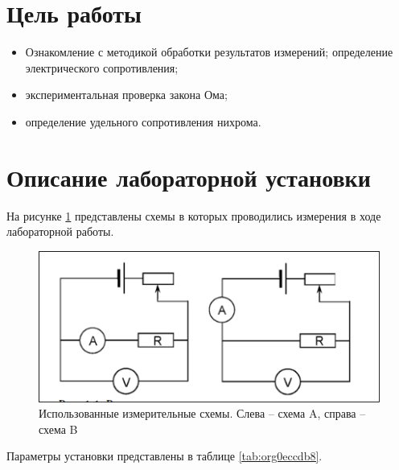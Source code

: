 \documentclass[14pt]{extarticle}
\begin{document}
\tableofcontents \clearpage


\section{Цель работы}
\label{sec:org79ca03a}

\begin{itemize}
\item Ознакомление с методикой обработки результатов измерений;
определение электрического сопротивления;
\item экспериментальная проверка закона Ома;
\item определение удельного сопротивления нихрома.
\end{itemize}

\section{Описание лабораторной установки}
\label{sec:org2fb4a39}

На рисунке \ref{fig:org949745b} представлены схемы в которых проводились измерения в ходе
лабораторной работы.

\begin{figure}[H]
\centering
\includegraphics[width=.9\linewidth]{./images/twoSchemes.png}
\caption{\label{fig:org949745b}Использованные измерительные схемы. Слева – схема A, справа – схема B}
\end{figure}

Параметры установки представлены в таблице \ref{tab:org0eccdb8}.
\end{document}
